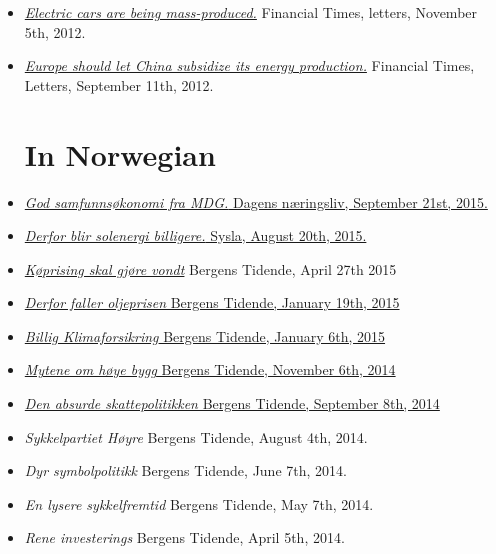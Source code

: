 \documentclass[margin]{res}
\begin{document}
\begin{resume}
\begin{itemize}
\item[] \href{http://www.ft.com/intl/cms/s/0/26168da6-238d-11e2-bb86-00144feabdc0.html#axzz2sclP2DP5}{\emph{Electric cars are being mass-produced.}}  Financial Times, letters, November 5th, 2012.

\item[] \href{http://www.ft.com/intl/cms/s/0/553d8cf6-fb56-11e1-87ae-00144feabdc0.html#axzz2sclP2DP5}{\emph{Europe should let China subsidize its energy production.}}  Financial Times, Letters, September 11th, 2012.


\normalsize{\section{In Norwegian}}
\item[] \href{http://www.dn.no/meninger/2015/09/20/2043/Politikk/god-samfunnskonomi-fra-mdg}{\emph{God samfunnsøkonomi fra MDG.} Dagens n\ae ringsliv, September 21st, 2015.}
\item[] \href{http://www.syslagronn.no/2015/08/20/syslagronn/derfor-blir-solenergi-billigere_51484/}{\emph{Derfor blir solenergi billigere.} Sysla, August 20th, 2015.}
\item[] \href{http://www.e-pages.dk/bergenstidende/1809/article/264899/28/2/render/?token=02cd272aa0579373983f0bf8c4cee611}{ \emph{K\o prising skal gjøre vondt}} Bergens Tidende, April 27th 2015
\item[] \href{http://www.bt.no/meninger/debatt/Derfor-faller-oljeprisen-3282375.html}{ \emph {Derfor faller oljeprisen} Bergens Tidende, January 19th, 2015}
\item[] \href{http://www.e-pages.dk/bergenstidende/1700/article/227941/31/4/render/?token=5207fb9bf5f917b5276532ef05164266}{ \emph {Billig Klimaforsikring} Bergens Tidende, January 6th, 2015}
\item[] \href{http://www.bt.no/meninger/debatt/Mytene-om-hoye-bygg-3234980.html}{ \emph {Mytene om h\o ye bygg} Bergens Tidende, November 6th, 2014}
\item[] \href{http://www.bt.no/meninger/debatt/Den-absurde-skattepolitikken-3191273.html}{\emph{Den absurde skattepolitikken} Bergens Tidende, September 8th, 2014}
\item[] \emph {Sykkelpartiet H\o yre}  Bergens Tidende, August 4th, 2014.
\item[] \emph {Dyr symbolpolitikk}  Bergens Tidende, June 7th, 2014.
\item[] \emph {En lysere sykkelfremtid}  Bergens Tidende, May 7th, 2014.
\item[] \emph {Rene investerings}  Bergens Tidende, April 5th, 2014.

\end{itemize}
\end{resume}
\end{document}

